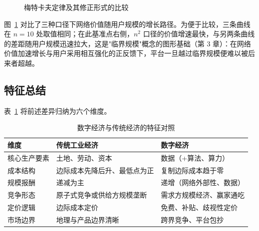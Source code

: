 \begin{figure}[htbp]
\centering
{}
\caption{梅特卡夫定律及其修正形式的比较}
\label{fig:metcalfe}
\end{figure}

图~\ref{fig:metcalfe} 对比了三种口径下网络价值随用户规模的增长路径。为便于比较，三条曲线在 $n=10$ 处取值相同；在此基准点右侧，$n^2$ 口径的价值增速最快，与另两条曲线的差距随用户规模迅速拉大，这是"临界规模"概念的图形基础（第 3 章）：在网络价值加速增长与用户采用相互强化的正反馈下，平台一旦越过临界规模便难以被后来者超越。

\subsection{特征总结}

表~\ref{tab:features} 将前述差异归纳为六个维度。

\begin{table}[H]
\centering
\caption{数字经济与传统经济的特征对照}
\label{tab:features}
\begin{tabular}{p{2.6cm}p{5.2cm}p{4.4cm}}
\hline
\textbf{维度} & \textbf{传统工业经济} & \textbf{数字经济} \\
\hline
核心生产要素 & 土地、劳动、资本 & 数据（+算法、算力） \\
成本结构 & 边际成本先降后升、最低点为正 & 复制边际成本趋于零 \\
规模报酬 & 递减为主 & 递增（网络外部性、数据） \\
竞争形态 & 原子式竞争或供给方规模垄断 & 需求方规模经济、赢家通吃 \\
定价逻辑 & 边际成本定价 & 免费、补贴、歧视性定价 \\
市场边界 & 地理与产品边界清晰 & 跨界竞争、平台包抄 \\
\hline
\end{tabular}
\end{table}

